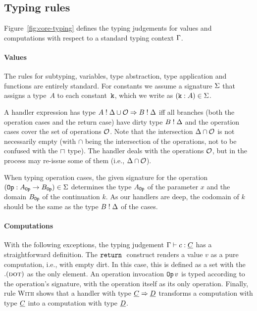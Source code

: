 
\subsection{Typing rules}
Figure~\ref{fig:core-typing} defines the typing judgements for values and computations with respect to a standard typing context $\Gamma$.

\paragraph{Values}
The rules for subtyping, variables, type abstraction, type application and functions are entirely standard. For constants we assume a signature $\Sigma$ that assigns a type~$A$ to each constant~$\mathtt{k}$, which we write as $(\mathtt{k} \mathrel{:} A) \in \Sigma$.

A handler expression has type $A \mathrel{!} \Delta \cup \mathcal{O} \Rightarrow B \mathrel{!} \Delta$ iff all branches (both the operation cases and the return case) have dirty type $B \mathrel{!} \Delta$ and the operation cases cover the set of operations $\mathcal{O}$. Note that the intersection $\Delta \cap \mathcal{O}$ is not necessarily empty (with $\cap$ being the intersection of the operations, not to be confused with the $\sqcap$ type). The handler deals with the operations $\mathcal{O}$, but in the process may re-issue some of them (i.e., $\Delta \cap \mathcal{O}$).

When typing operation cases, the given signature for the operation $(\mathtt{Op} \mathrel{:} A_{\mathtt{Op}} \to B_{\mathtt{Op}}) \in \Sigma$ determines the type $A_{\mathtt{Op}}$ of the parameter $x$ and the domain $B_{\mathtt{Op}}$ of the continuation $k$. As our handlers are deep, the codomain of $k$ should be the same as the type $B \mathrel{!} \Delta$ of the cases.

\paragraph{Computations}
With the following exceptions, the typing judgement $\Gamma \vdash c : \underline{C}$ has a straightforward definition. The $\mathtt{return}\;$ construct renders a value $v$ as a pure computation, i.e., with empty dirt. In this case, this is defined as a set with the $. (\textsc{dot})$ as the only element. An operation invocation $\mathtt{Op}\,v$ is typed according to the operation's signature, with the operation itself as its only operation. Finally, rule \textsc{With} shows that a handler with type $\underline{C} \Rightarrow \underline{D}$ transforms a computation with type $\underline{C}$ into a computation with type $\underline{D}$.

